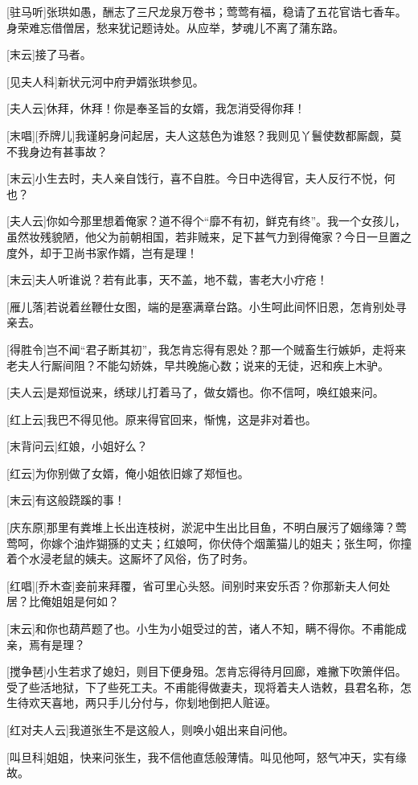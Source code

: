 \documentclass{book}
\begin{document}
[驻马听]张珙如愚，酬志了三尺龙泉万卷书；莺莺有福，稳请了五花官诰七香车。身荣难忘借僧居，愁来犹记题诗处。从应举，梦魂儿不离了蒲东路。

[末云]接了马者。

[见夫人科]新状元河中府尹婿张珙参见。

[夫人云]休拜，休拜！你是奉圣旨的女婿，我怎消受得你拜！

[末唱][乔牌儿]我谨躬身问起居，夫人这慈色为谁怒？我则见丫鬟使数都厮觑，莫不我身边有甚事故？

[末云]小生去时，夫人亲自饯行，喜不自胜。今日中选得官，夫人反行不悦，何也？

[夫人云]你如今那里想着俺家？道不得个``靡不有初，鲜克有终''。我一个女孩儿，虽然妆残貌陋，他父为前朝相国，若非贼来，足下甚气力到得俺家？今日一旦置之度外，却于卫尚书家作婿，岂有是理！

[末云]夫人听谁说？若有此事，天不盖，地不载，害老大小疔疮！

[雁儿落]若说着丝鞭仕女图，端的是塞满章台路。小生呵此间怀旧恩，怎肯别处寻亲去。

[得胜令]岂不闻``君子断其初''，我怎肯忘得有恩处？那一个贼畜生行嫉妒，走将来老夫人行厮间阻？不能勾娇姝，早共晚施心数；说来的无徒，迟和疾上木驴。

[夫人云]是郑恒说来，绣球儿打着马了，做女婿也。你不信呵，唤红娘来问。

[红上云]我巴不得见他。原来得官回来，惭愧，这是非对着也。

[末背问云]红娘，小姐好么？

[红云]为你别做了女婿，俺小姐依旧嫁了郑恒也。

[末云]有这般跷蹊的事！

[庆东原]那里有粪堆上长出连枝树，淤泥中生出比目鱼，不明白展污了姻缘簿？莺莺呵，你嫁个油炸猢猻的丈夫；红娘呵，你伏侍个烟薰猫儿的姐夫；张生呵，你撞着个水浸老鼠的姨夫。这厮坏了风俗，伤了时务。

[红唱][乔木查]妾前来拜覆，省可里心头怒。间别时来安乐否？你那新夫人何处居？比俺姐姐是何如？

[末云]和你也葫芦题了也。小生为小姐受过的苦，诸人不知，瞒不得你。不甫能成亲，焉有是理？

[搅争琶]小生若求了媳妇，则目下便身殂。怎肯忘得待月回廊，难撇下吹箫伴侣。受了些活地狱，下了些死工夫。不甫能得做妻夫，现将着夫人诰敕，县君名称，怎生待欢天喜地，两只手儿分付与，你刬地倒把人赃诬。

[红对夫人云]我道张生不是这般人，则唤小姐出来自问他。

[叫旦科]姐姐，快来问张生，我不信他直恁般薄情。叫见他呵，怒气冲天，实有缘故。
\end{document}
